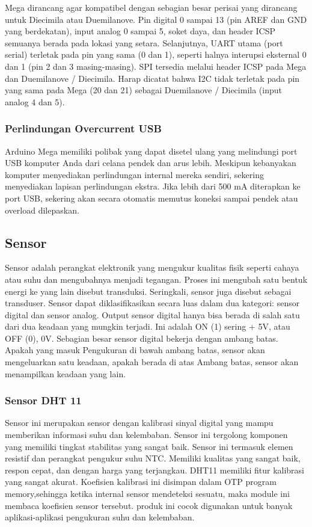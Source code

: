 Mega dirancang agar kompatibel dengan sebagian besar perisai yang dirancang untuk Diecimila atau Duemilanove. Pin digital 0 sampai 13 (pin AREF dan GND yang berdekatan), input analog 0 sampai 5, soket daya, dan header ICSP semuanya berada pada lokasi yang setara. Selanjutnya, UART utama (port serial) terletak pada pin yang sama (0 dan 1), seperti halnya interupsi eksternal 0 dan 1 (pin 2 dan 3 masing-masing). SPI tersedia melalui header ICSP pada Mega dan Duemilanove / Diecimila. Harap dicatat bahwa I2C tidak terletak pada pin yang sama pada Mega (20 dan 21) sebagai Duemilanove / Diecimila (input analog 4 dan 5).

\subsubsection{Perlindungan Overcurrent USB}
Arduino Mega memiliki polibak yang dapat disetel ulang yang melindungi port USB komputer Anda dari celana pendek dan arus lebih. Meskipun kebanyakan komputer menyediakan perlindungan internal mereka sendiri, sekering menyediakan lapisan perlindungan ekstra. Jika lebih dari 500 mA diterapkan ke port USB, sekering akan secara otomatis memutus koneksi sampai pendek atau overload dilepaskan.
\subsection{Sensor}
Sensor adalah perangkat elektronik yang mengukur kualitas fisik seperti cahaya atau
suhu dan mengubahnya menjadi tegangan. Proses ini mengubah satu bentuk energi
ke yang lain disebut transduksi. Seringkali, sensor juga disebut sebagai transduser.
Sensor dapat diklasifikasikan secara luas dalam dua kategori: sensor digital dan sensor analog.
Output sensor digital hanya bisa berada di salah satu dari dua keadaan yang mungkin terjadi. Ini adalah ON (1)
sering + 5V, atau OFF (0), 0V. Sebagian besar sensor digital bekerja dengan ambang batas. Apakah yang masuk
Pengukuran di bawah ambang batas, sensor akan mengeluarkan satu keadaan, apakah berada di atas
Ambang batas, sensor akan menampilkan keadaan yang lain.

\subsubsection{Sensor DHT 11}
Sensor ini merupakan sensor dengan kalibrasi sinyal digital yang mampu memberikan informasi suhu dan kelembaban. Sensor ini tergolong komponen yang memiliki tingkat stabilitas yang sangat baik. Sensor ini termasuk elemen resistif dan perangkat pengukur suhu NTC.
Memiliki kualitas yang sangat baik, respon cepat, dan dengan harga yang
terjangkau. DHT11 memiliki fitur kalibrasi yang sangat akurat. Koefisien kalibrasi ini disimpan dalam OTP program memory,sehingga ketika internal sensor mendeteksi sesuatu, maka module ini membaca koefisien sensor tersebut. produk ini cocok digunakan untuk banyak aplikasi-aplikasi pengukuran suhu dan kelembaban.


